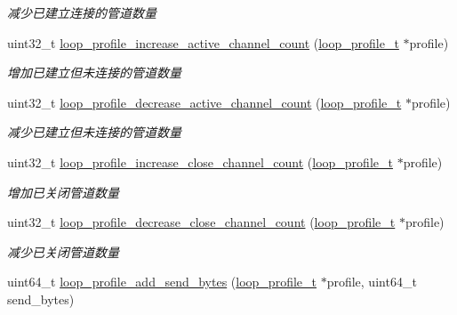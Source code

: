 \begin{DoxyCompactItemize}
\begin{DoxyCompactList}\small\item\em 减少已建立连接的管道数量 \end{DoxyCompactList}\item 
uint32\+\_\+t \hyperlink{a00079_a60b6b1d29dcb8746bc44c90b8b438544_a60b6b1d29dcb8746bc44c90b8b438544}{loop\+\_\+profile\+\_\+increase\+\_\+active\+\_\+channel\+\_\+count} (\hyperlink{a00051_ad060e1396346d2f5db1ec0597376a107_ad060e1396346d2f5db1ec0597376a107}{loop\+\_\+profile\+\_\+t} $\ast$profile)
\begin{DoxyCompactList}\small\item\em 增加已建立但未连接的管道数量 \end{DoxyCompactList}\item 
uint32\+\_\+t \hyperlink{a00079_ab1bcbe8b5c4c4618605821581cdcaacd_ab1bcbe8b5c4c4618605821581cdcaacd}{loop\+\_\+profile\+\_\+decrease\+\_\+active\+\_\+channel\+\_\+count} (\hyperlink{a00051_ad060e1396346d2f5db1ec0597376a107_ad060e1396346d2f5db1ec0597376a107}{loop\+\_\+profile\+\_\+t} $\ast$profile)
\begin{DoxyCompactList}\small\item\em 减少已建立但未连接的管道数量 \end{DoxyCompactList}\item 
uint32\+\_\+t \hyperlink{a00079_ae06a8af9d1d8e3b32a3ae6220aa904b2_ae06a8af9d1d8e3b32a3ae6220aa904b2}{loop\+\_\+profile\+\_\+increase\+\_\+close\+\_\+channel\+\_\+count} (\hyperlink{a00051_ad060e1396346d2f5db1ec0597376a107_ad060e1396346d2f5db1ec0597376a107}{loop\+\_\+profile\+\_\+t} $\ast$profile)
\begin{DoxyCompactList}\small\item\em 增加已关闭管道数量 \end{DoxyCompactList}\item 
uint32\+\_\+t \hyperlink{a00079_abae75de750f7969632e5e8087eb6c778_abae75de750f7969632e5e8087eb6c778}{loop\+\_\+profile\+\_\+decrease\+\_\+close\+\_\+channel\+\_\+count} (\hyperlink{a00051_ad060e1396346d2f5db1ec0597376a107_ad060e1396346d2f5db1ec0597376a107}{loop\+\_\+profile\+\_\+t} $\ast$profile)
\begin{DoxyCompactList}\small\item\em 减少已关闭管道数量 \end{DoxyCompactList}\item 
uint64\+\_\+t \hyperlink{a00079_a04e566a4074bb91aa86119c34157c440_a04e566a4074bb91aa86119c34157c440}{loop\+\_\+profile\+\_\+add\+\_\+send\+\_\+bytes} (\hyperlink{a00051_ad060e1396346d2f5db1ec0597376a107_ad060e1396346d2f5db1ec0597376a107}{loop\+\_\+profile\+\_\+t} $\ast$profile, uint64\+\_\+t send\+\_\+bytes)

\end{DoxyCompactItemize}
